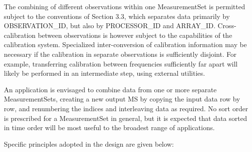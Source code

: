 \documentclass{article}
\begin{document}
\begin{itemize}
{ The combining of different observations within one MeasurementSet
is permitted subject to the conventions of Section 3.3, which
separates data primarily by OBSERVATION\_ID, but also by
PROCESSOR\_ID and ARRAY\_ID. Cross-calibration between observations
is however subject to the capabilities of the calibration
system. Specialized inter-conversion of calibration information may be
necessary if the calibration in separate observations is sufficiently
disjoint. For example, transferring calibration between frequencies
sufficiently far apart will likely be performed in an intermediate
step, using external utilities.

 An application is envisaged to combine data from one or more
separate MeasurementSets, creating a new output MS by copying the
input data row by row, and renumbering the indices and interleaving
data as required. No sort order is prescribed for a MeasurementSet in
general, but it is expected that data sorted in time order will be
most useful to the broadest range of applications.}

\end{itemize}

Specific principles adopted in the design are given below:
\end{document}
